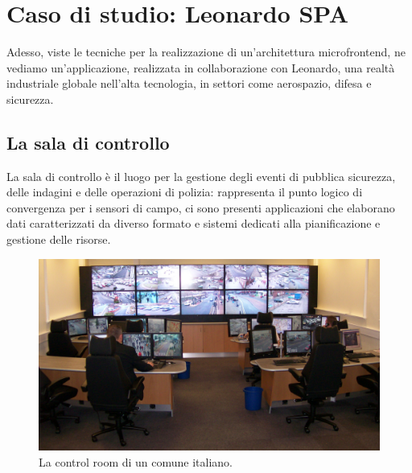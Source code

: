 \chapter{Caso di studio: Leonardo SPA}\label{ch:leonardo}
Adesso, viste le tecniche per la realizzazione di un'architettura microfrontend, ne vediamo
un'applicazione, realizzata in collaborazione con Leonardo, una realtà industriale globale 
nell'alta tecnologia, in settori come aerospazio, difesa e sicurezza.
\section{La sala di controllo}
La sala di controllo è il luogo per la gestione degli eventi di pubblica sicurezza, delle indagini e
delle operazioni di polizia: rappresenta il punto logico di convergenza per i sensori di campo,
ci sono presenti applicazioni che elaborano dati caratterizzati da diverso formato 
e sistemi dedicati alla pianificazione e gestione delle risorse.
\begin{figure}[H]
  \centering
  \includegraphics[width=140mm]{img/control-room.jpeg}
  \caption{La control room di un comune italiano.}
\end{figure}
 
